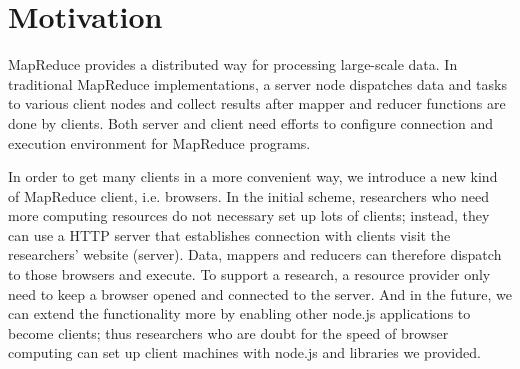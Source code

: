 \section{Motivation}
\label{ch2}

MapReduce provides a distributed way for processing large-scale data. In traditional MapReduce implementations, a server node dispatches data and tasks to various client nodes and collect results after mapper and reducer functions are done by clients. Both server and client need efforts to configure connection and execution environment for MapReduce programs.

In order to get many clients in a more convenient way, we introduce a new kind of MapReduce client, i.e. browsers. In the initial scheme, researchers who need more computing resources do not necessary set up lots of clients; instead, they can use a HTTP server that establishes connection with clients visit the researchers’ website (server). Data, mappers and reducers can therefore dispatch to those browsers and execute. To support a research, a resource provider only need to keep a browser opened and connected to the server. And in the future, we can extend the functionality more by enabling other node.js applications to become clients; thus researchers who are doubt for the speed of browser computing can set up client machines with node.js and libraries we provided.